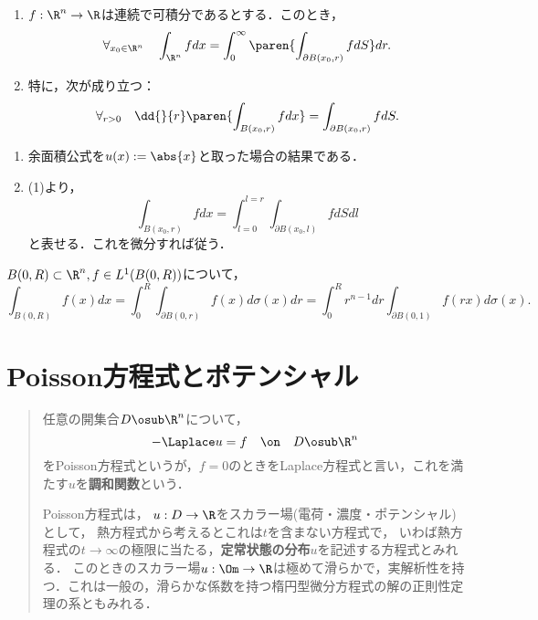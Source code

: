 \documentclass[uplatex,dvipdfmx]{jsreport}
\begin{document}
\begin{corollary}[球面積分の性質]\mbox{}\label{cor-property-of-ball-surface-integral}
    \begin{enumerate}
        \item $f:\R^n\to\R$は連続で可積分であるとする．このとき，
        \[\forall_{x_0\in\R^n}\quad\int_{\R^n}fdx=\int^\infty_0\paren{\int_{\partial B(x_0,r)}fdS}dr.\]
        \item 特に，次が成り立つ：
        \[\forall_{r>0}\quad\dd{}{r}\paren{\int_{B(x_0,r)}fdx}=\int_{\partial B(x_0,r)}fdS.\]
    \end{enumerate}
\end{corollary}
\begin{Proof}\mbox{}
    \begin{enumerate}
        \item 余面積公式を$u(x):=\abs{x}$と取った場合の結果である．
        \item (1)より，
        \[\int_{B(x_0,r)}fdx=\int_{l=0}^{l=r}\int_{\partial B(x_0,l)}fdSdl\]
        と表せる．これを微分すれば従う．
    \end{enumerate}
\end{Proof}

\begin{corollary}[球面上の積分と球体上の積分との関係]\label{thm-sphere-and-ball}
    $B(0,R)\subset\R^n, f\in L^1(B(0,R))$について，
    \[\int_{B(0,R)}f(x)dx=\int^R_0\int_{\partial B(0,r)}f(x)d\sigma(x)dr=\int^R_0r^{n-1}dr\int_{\partial B(0,1)}f(rx)d\sigma(x).\]
\end{corollary}

\chapter{Poisson方程式とポテンシャル}

\begin{quotation}
    任意の開集合$D\osub\R^n$について，
    \[-\Laplace u=f\quad\on\quad D\osub\R^n\]
    をPoisson方程式というが，$f=0$のときをLaplace方程式と言い，これを満たす$u$を\textbf{調和関数}という．
    
    Poisson方程式は，
    $u:D\to\R$をスカラー場(電荷・濃度・ポテンシャル)として，
    熱方程式から考えるとこれは$t$を含まない方程式で，
    いわば熱方程式の$t\to\infty$の極限に当たる，\textbf{定常状態の分布$u$}を記述する方程式とみれる．
    このときのスカラー場$u:\Om\to\R$は極めて滑らかで，実解析性を持つ．これは一般の，滑らかな係数を持つ楕円型微分方程式の解の正則性定理の系ともみれる．
\end{quotation}
\end{document}
